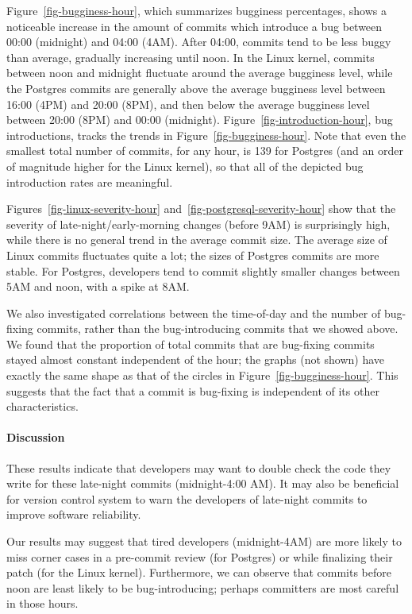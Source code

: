 Figure~\ref{fig-bugginess-hour}, which summarizes bugginess
percentages, shows a noticeable increase in the amount of commits which
introduce a bug between 00:00 (midnight) and 04:00 (4AM). After 04:00,
commits tend to be less buggy than average, gradually increasing until
noon.  In the Linux kernel, commits between noon and midnight
fluctuate around the average bugginess level, while the Postgres
commits are generally above the average bugginess level between 16:00
(4PM) and 20:00 (8PM), and then below the average bugginess level
between 20:00 (8PM) and 00:00
(midnight). Figure~\ref{fig-introduction-hour},
bug introductions, tracks the trends in
Figure~\ref{fig-bugginess-hour}. Note that even the smallest
total number of commits, for any hour, is 139 for Postgres (and an
order of magnitude higher for the Linux kernel), so that all of the
depicted bug introduction rates are meaningful.

Figures~\ref{fig-linux-severity-hour}
and~\ref{fig-postgresql-severity-hour} show that the severity of
late-night/early-morning changes (before 9AM) is surprisingly high,
while there is no general trend in the average commit size.
The average size of Linux commits fluctuates quite a lot; the sizes of
Postgres commits are more stable.  For Postgres, developers tend to
commit slightly smaller changes between 5AM and noon, with a spike at 8AM.

We also investigated correlations between the time-of-day and the
number of bug-fixing commits, rather than the bug-introducing commits
that we showed above. We found that the proportion of total
commits that are bug-fixing commits stayed almost constant independent
of the hour; the graphs (not shown) have exactly the same shape as
that of the circles in Figure~\ref{fig-bugginess-hour}.
This suggests that the fact
that a commit is bug-fixing is independent of its other characteristics.

\paragraph{Discussion}
These results indicate that developers may want to double check the code they write for these 
late-night commits (midnight-4:00 AM).
It may also be beneficial for version control
system to warn the developers of late-night commits to improve software reliability. 

Our results may suggest that tired developers (midnight-4AM) are more
likely to miss corner cases in a pre-commit review (for Postgres) or
while finalizing their patch (for the Linux kernel). Furthermore, we can observe
that commits before noon are least likely to be bug-introducing;
perhaps committers are most careful in those hours.
%

